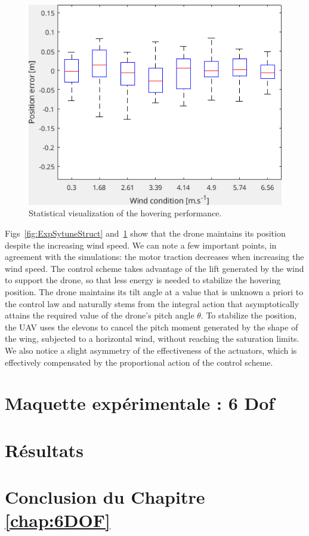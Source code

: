 \begin{figure}[ht!]
    \centering
    \includegraphics[trim=0cm 0cm 0cm 0cm,clip,width=0.9\columnwidth]{figures/boxplot.png}
    \caption{Statistical visualization of the hovering performance.}
    \label{fig:statpos}
\end{figure}
Figs~\ref{fig:ExpSytuneStruct} and~\ref{fig:statpos} show that the drone maintains its position despite the increasing wind speed. We can note a few important points, in agreement with the simulations: the motor traction decreases when increasing the wind speed. The control scheme takes advantage of the lift generated by the wind to support the drone, so that less energy is needed to stabilize the hovering position. The drone maintains its tilt angle at a value that is unknown a priori to the control law and naturally stems from the integral action that asymptotically attains the required value of the drone's pitch angle $\theta$. To stabilize the position, the UAV uses the elevons to cancel the pitch moment generated by the shape of the wing, subjected to a horizontal wind, without reaching the saturation limits.
We also notice a slight asymmetry of the effectiveness of the actuators, which is effectively compensated by the proportional action of the control scheme.
\section{Maquette expérimentale : 6 Dof}

\section{Résultats}

\section{Conclusion du Chapitre \ref{chap:6DOF}}




